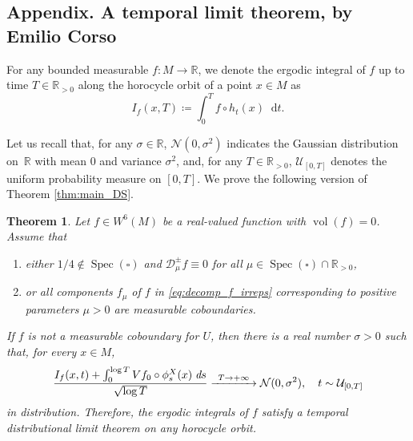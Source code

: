 \documentclass[JEP,XML,SOM,NoEqCountersInSection,Unicode,published]{cedram}
\newenvironment{enumeratea}
{\bgroup\def\theenumi{\alph{enumi}}\begin{enumerate}}
{\end{enumerate}\egroup}
\newcommand\To[1]{\mathchoice{\xrightarrow{\kern4pt#1\kern3pt}}{\stackrel{#1}{\longrightarrow}}{}{}}
\newcommand \R{\mathbb{R}}
\newcommand {\cN}{\mathcal{N}}
\newcommand*{\diff}{\mathop{}\!\mathrm{d}}
\newcommand{\Dpm}[1]{\mathcal{D}_\mu^{\pm} #1}
\DeclareMathOperator{\vol}{vol}
\DeclareMathOperator{\Spec}{Spec}
\newtheorem{theorem}{Theorem}
\theoremstyle{definition}
\begin{document}
\begin{appendix}
\let\oldthefootnote\thefootnote
\renewcommand{\thefootnote}{*}
\section*{Appendix. A temporal limit theorem, by Emilio Corso\texorpdfstring{\protect\footnotemark}{fn}}

\setcounter{footnote}{0}
\let\thefootnote\oldthefootnote

For any bounded measurable $f\colon M\to \R$, we denote the ergodic integral of $f$ up to time $T\in \R_{>0}$ along the horocycle orbit of a point $x\in M$ as
\begin{equation*}
I_f(x,T)\coloneqq\int_0^{T}f\circ h_t(x)\diff t.
\end{equation*}

Let us recall that, for any $\sigma\in \R$, $\cN(0,\sigma^{2})$ indicates the Gaussian distribution on~$\R$ with mean $0$ and variance $\sigma^{2}$, and, for any $T\in \R_{>0}$, $\mathcal{U}_{[0,T]}$ denotes the uniform probability measure on $[0,T]$.
We prove the following version of Theorem \ref{thm:main_DS}.

\begin{theorem}
\label{temporalDLT}
Let $f \in W^6(M)$ be a real-valued function with $\vol(f)=0$.
Assume that
\begin{enumeratea}
\item\label{temporalDLTa}
either $1/4 \notin \Spec(\square)$ and $\Dpm{f} \equiv 0$ for all $\mu \in \Spec(\square) \cap \R_{>0}$,
\item\label{temporalDLTb}
or all components $f_\mu$ of $f$ in \eqref{eq:decomp_f_irreps} corresponding to positive parameters $\mu >0$ are measurable coboundaries.
\end{enumeratea}
If $f$ is not a measurable coboundary for $U$, then there is a real number $\sigma>0$ such that, for every $x \in M$,
\begin{equation}
\label{distrlimit}
\frac{I_f(x,t)+\int_0^{\log{T}}Vf_0\circ\phi^{X}_s(x)\;\emph{d}s}{\sqrt{\log{T}}}\To{T\to+\infty}\cN(0,\sigma^{2}), \quad t\sim \mathcal{U}_{[0,T]}
\end{equation}
in distribution. Therefore, the ergodic integrals of $f$ satisfy a temporal distributional limit theorem on any horocycle orbit.
\end{theorem}


\end{appendix}
\end{document}
